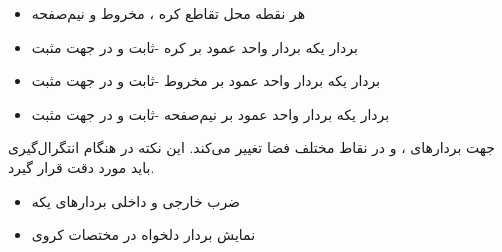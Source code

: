 \begin{ELunit}


\begin{itemize}
\tightlist
\item
  هر نقطه  محل تقاطع کره ، مخروط  و نیم‌صفحه 
\item
  بردار یکه  \ELim{\ELto} بردار واحد عمود بر کره -ثابت و در جهت مثبت
\item
  بردار یکه \ELim{\uvec{\theta}} \ELim{\ELto} بردار واحد عمود بر مخروط \ELim{\theta}-ثابت و در جهت مثبت
\item
  بردار یکه \ELim{\uvec{\phi}} \ELim{\ELto} بردار واحد عمود بر نیم‌صفحه \ELim{\phi}-ثابت و در جهت مثبت
\end{itemize}

\end{ELunit}

\begin{ELremark}{}

جهت بردارهای ، \ELim{\uvec{\theta}} و \ELim{\uvec{\phi}} در نقاط مختلف فضا تغییر می‌کند. این نکته در هنگام انتگرال‌گیری باید مورد دقت قرار گیرد.

\end{ELremark}

\begin{ELunit}

\begin{itemize}
\tightlist
\item
  ضرب خارجی و داخلی بردارهای یکه
\end{itemize}




\end{ELunit}

\begin{ELjoin}

\begin{itemize}
\tightlist
\item
  نمایش بردار دلخواه  در مختصات کروی
\end{itemize}

\begin{ELimportant}{}


\end{ELimportant}

\end{ELjoin}

